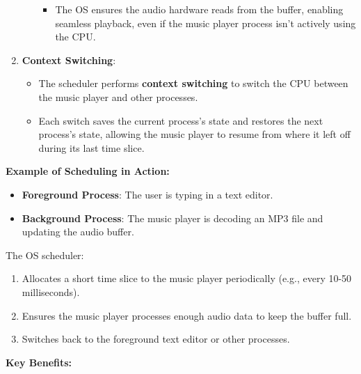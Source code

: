 \documentclass[a4paper]{book}
\begin{document}
\begin{enumerate}
\begin{itemize}
\begin{itemize}
\item
The OS ensures the audio hardware reads from the buffer, enabling seamless playback, even if the music player process isn't actively using the CPU.

\end{itemize}

\end{itemize}

\item
\textbf{Context Switching}:
\begin{itemize}
\item
The scheduler performs \textbf{context switching} to switch the CPU between the music player and other processes.

\item
Each switch saves the current process's state and restores the next process's state, allowing the music player to resume from where it left off during its last time slice.

\end{itemize}

\end{enumerate}

\hrulefill

\textbf{Example of Scheduling in Action:}

\begin{itemize}
\item
\textbf{Foreground Process}: The user is typing in a text editor.

\item
\textbf{Background Process}: The music player is decoding an MP3 file and updating the audio buffer.

\end{itemize}

The OS scheduler:
\begin{enumerate}
\item
Allocates a short time slice to the music player periodically (e.g., every 10-50 milliseconds).  

\item
Ensures the music player processes enough audio data to keep the buffer full.

\item
Switches back to the foreground text editor or other processes.

\end{enumerate}

\hrulefill

\textbf{Key Benefits:}
\end{document}
